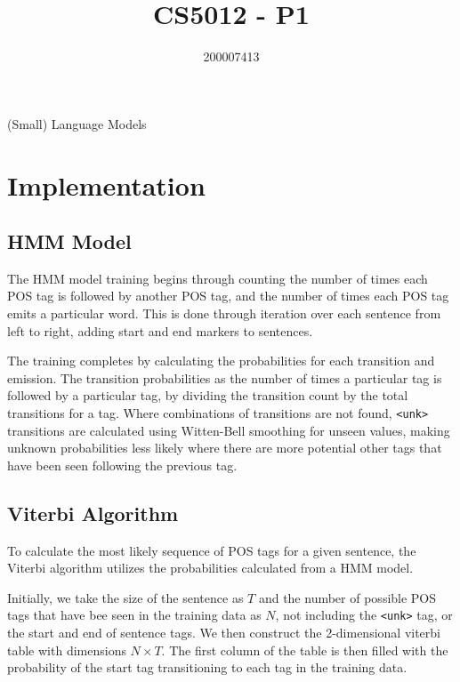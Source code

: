 \documentclass[a4paper, 12pt]{article}
\title{CS5012 - P1}
\author{200007413}
\date{}
\begin{document}
\begin{titlepage}
    \centering
    \vspace*{\fill}
    {\Huge\thetitle}

    {\LARGE(Small) Language Models}
    
    {\large\theauthor}
    \vspace*{\fill}
\end{titlepage}

\pagebreak

\section{Implementation}


\subsection{HMM Model}

The HMM model training begins through counting the number of times each POS tag is followed by another POS tag, and the number of times each POS tag emits a particular word.
This is done through iteration over each sentence from left to right, adding start and end markers to sentences.

The training completes by calculating the probabilities for each transition and emission. The transition probabilities as the number of times a particular tag is followed by a particular tag, by dividing the transition count by the total transitions for a tag. Where combinations of transitions are not found, \texttt{<unk>} transitions are calculated using Witten-Bell smoothing for unseen values, making unknown probabilities less likely where there are more potential other tags that have been seen following the previous tag.

\subsection{Viterbi Algorithm}

To calculate the most likely sequence of POS tags for a given sentence, the Viterbi algorithm utilizes the probabilities calculated from a HMM model. 

Initially, we take the size of the sentence as $T$ and the number of possible POS tags that have bee seen in the training data as $N$, not including the \texttt{<unk>} tag, or the start and end of sentence tags. We then construct the 2-dimensional viterbi table with dimensions $N \times T$. The first column of the table is then filled with the probability of the start tag transitioning to each tag in the training data.
\end{document}
